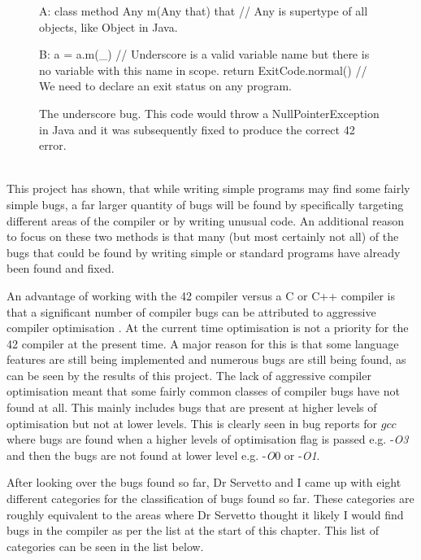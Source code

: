 \begin{figure}[h]
\begin{42listing}

	A: {
		class method Any m(Any that) that // Any is supertype of all objects, like Object in Java.
	}
	
	B: {
		a = a.m(_) // Underscore is a valid variable name but there is no variable with this name in scope.
		return ExitCode.normal() // We need to declare an exit status on any program.
	}
	
\end{42listing}
\caption[The underscore bug] {The underscore bug. This code would throw a NullPointerException in Java and it was subsequently fixed to produce the correct 42 error.}
\end{figure}
~\\
This project has shown, that while writing simple programs may find some fairly simple bugs, a far larger quantity of bugs will be found by specifically targeting different areas of the compiler or by writing unusual code. An additional reason to focus on these two 
methods is that many (but most certainly not all) of the bugs that could be found by writing simple or standard programs have already been found and fixed. 

An advantage of working with the 42 compiler versus a C or C++ compiler is that a significant number of compiler bugs can be attributed to aggressive compiler optimisation \cite{gccbugs}\cite{opLecture}\cite{stackOp}\cite{lwnNull}. At the current time optimisation is not a priority for the 42 compiler at the present time. A major reason for this is that some language features are still being implemented and numerous bugs are still being found, as can be seen by the results of this project. The lack of aggressive compiler optimisation meant that some fairly common classes of compiler bugs have not found at all. This mainly includes bugs that are present at higher levels of optimisation but not at lower levels. This is clearly seen in bug reports for $gcc$ where bugs are found when a higher levels of optimisation flag is passed e.g. -\textit{O3} and then the bugs are not found at lower level e.g. -\textit{O$0$} or -\textit{O1}. 

After looking over the bugs found so far, Dr Servetto and I came up with eight different categories for the classification of bugs found so far. These categories are roughly equivalent to the areas where Dr Servetto thought it likely I would find bugs in the compiler as per the list at the start of this chapter. This list of categories can be seen in the list below.

